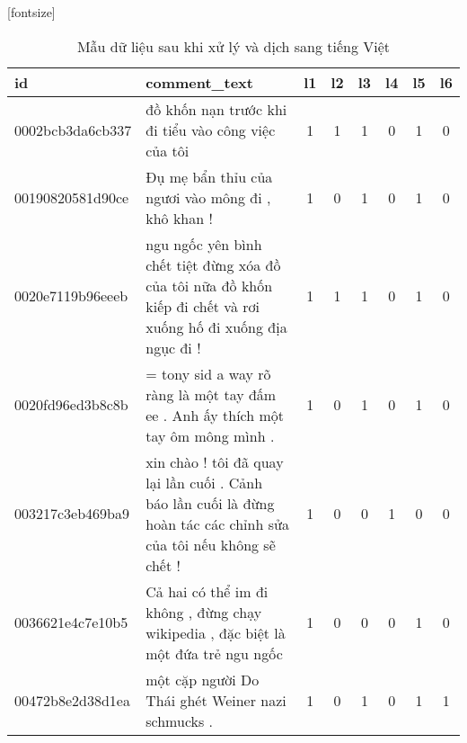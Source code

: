 \begin{center}
    \begin{sidewaystable}[htb]
        \centering
        \caption{Mẫu dữ liệu sau khi xử lý và dịch sang tiếng Việt}
        [fontsize]
        \fontsize{8pt}{12pt}\selectfont
        \begin{tabularx}{\textwidth}{L{0.8} L{6.6} C{0.1} C{0.1} C{0.1} C{0.1} C{0.1} C{0.1}}
            \toprule
            \textbf{id}      & \textbf{comment\_text}                                                                                                            & \textbf{l1} & \textbf{l2} & \textbf{l3} & \textbf{l4} & \textbf{l5} & \textbf{l6} \\\midrule
            0002bcb3da6cb337 & đồ khốn nạn trước khi đi tiểu vào công việc của tôi                                                                               & 1           & 1           & 1           & 0           & 1           & 0           \\
            00190820581d90ce & Đụ mẹ bẩn thỉu của ngươi vào mông đi , khô khan !                                                                                 & 1           & 0           & 1           & 0           & 1           & 0           \\
            0020e7119b96eeeb & ngu ngốc yên bình chết tiệt đừng xóa đồ của tôi nữa đồ khốn kiếp đi chết và rơi xuống hố đi xuống địa ngục đi !                   & 1           & 1           & 1           & 0           & 1           & 0           \\
            0020fd96ed3b8c8b & = tony sid a way rõ ràng là một tay đấm ee . Anh ấy thích một tay ôm mông mình .                                                  & 1           & 0           & 1           & 0           & 1           & 0           \\
            003217c3eb469ba9 & xin chào ! tôi đã quay lại lần cuối . Cảnh báo lần cuối là đừng hoàn tác các chỉnh sửa của tôi nếu không sẽ chết !                & 1           & 0           & 0           & 1           & 0           & 0           \\
            0036621e4c7e10b5 & Cả hai có thể im đi không , đừng chạy wikipedia , đặc biệt là một đứa trẻ ngu ngốc                                                & 1           & 0           & 0           & 0           & 1           & 0           \\
            00472b8e2d38d1ea & một cặp người Do Thái ghét Weiner nazi schmucks .                                                                                 & 1           & 0           & 1           & 0           & 1           & 1           \\

\end{tabularx}
\end{sidewaystable}
\end{center}
